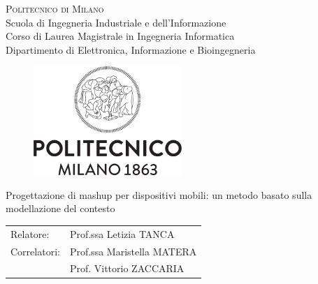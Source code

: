\begin{titlepage}

\begin{center}
\Large{\textsc{Politecnico di Milano}}\\
\Large{Scuola di Ingegneria Industriale e dell'Informazione}\\
\large{Corso di Laurea Magistrale in Ingegneria Informatica}\\
\large{Dipartimento di Elettronica, Informazione e Bioingegneria}
\par\end{center}

\vspace{0.5cm}


\begin{center}
\begin{figure}[h]
\centering{}\includegraphics[width=0.5\textwidth]{frontespizio/logo-polimi.png}
\end{figure}
\vspace{1cm}

\par\end{center}

\begin{center}
\LARGE{Progettazione di mashup per dispositivi mobili: un metodo basato sulla modellazione del contesto}\vspace{2cm}

\par\end{center}

\begin{flushleft}
\begin{tabular}{ll}
Relatore:  & Prof.ssa Letizia TANCA\tabularnewline
Correlatori:  & Prof.ssa Maristella MATERA\tabularnewline
	& Prof. Vittorio ZACCARIA
\end{tabular}\vspace{1cm}

\par\end{flushleft}


\end{titlepage}
